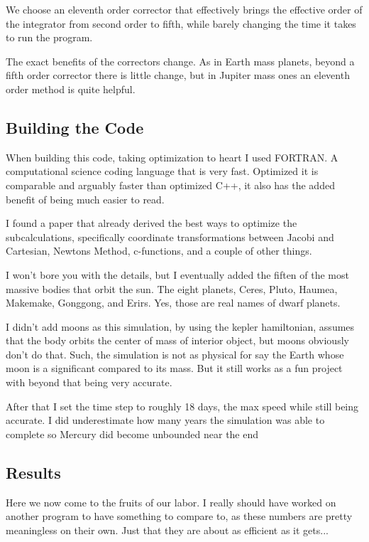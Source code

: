 We choose an eleventh order corrector that effectively brings the effective order of the integrator from second order to fifth, while barely changing the time it takes to run the program.

The exact benefits of the correctors change. As in Earth mass planets, beyond a fifth order corrector there is little change, but in Jupiter mass ones an eleventh order method is quite helpful.


\subsection{Building the Code}

When building this code, taking optimization to heart I used FORTRAN. A computational science coding language that is very fast. Optimized it is comparable and arguably faster than optimized C++, it also has the added benefit of being much easier to read.

I found a paper that already derived the best ways to optimize the subcalculations, specifically coordinate transformations between Jacobi and Cartesian, Newtons Method, c-functions, and a couple of other things.

I won't bore you with the details, but I eventually added the fiften of the most massive bodies that orbit the sun. The eight planets, Ceres, Pluto, Haumea, Makemake, Gonggong, and Erirs. Yes, those are real names of dwarf planets.

I didn't add moons as this simulation, by using the kepler hamiltonian, assumes that the body orbits the center of mass of interior object, but moons obviously don't do that. Such, the simulation is not as physical for say the Earth whose moon is a significant compared to its mass. But it still works as a fun project with beyond that being very accurate.

After that I set the time step to roughly 18 days, the max speed while still being accurate. I did underestimate how many years the simulation was able to complete so Mercury did become unbounded near the end

\subsection{Results}

Here we now come to the fruits of our labor. I really should have worked on another program to have something to compare to, as these numbers are pretty meaningless on their own. Just that they are about as efficient as it gets...

